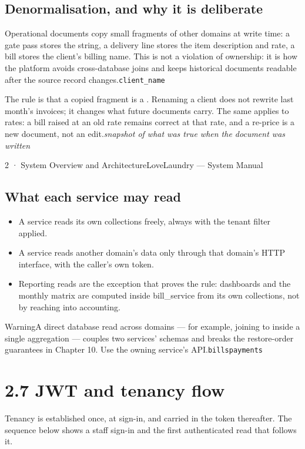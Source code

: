 \documentclass[11pt,a4paper,oneside]{book}
\begin{document}
\subsection*{Denormalisation, and why it is deliberate}
Operational documents copy small fragments of other domains at write time: a gate pass stores the  string, a delivery line stores the item description and rate, a bill stores the client's billing name. This is not a violation of ownership: it is how the platform avoids cross-database joins and keeps historical documents readable after the source record changes.\texttt{client\_name}

The rule is that a copied fragment is a . Renaming a client does not rewrite last month's invoices; it changes what future documents carry. The same applies to rates: a bill raised at an old rate remains correct at that rate, and a re-price is a new document, not an edit.\emph{snapshot of what was true when the document was written}

2 · System Overview and ArchitectureLoveLaundry — System Manual

\subsection*{What each service may read}
\begin{itemize}
\item A service reads its own collections freely, always with the tenant filter applied.
\item A service reads another domain's data only through that domain's HTTP interface, with the caller's own token.
\item Reporting reads are the exception that proves the rule: dashboards and the monthly matrix are computed inside bill\_service from its own collections, not by reaching into accounting.
\end{itemize}
\begin{notebox}WarningA direct database read across domains — for example, joining  to  inside a single aggregation — couples two services' schemas and breaks the restore-order guarantees in Chapter 10. Use the owning service's API.\texttt{bills}\texttt{payments}\end{notebox}
\section{2.7 JWT and tenancy flow}
Tenancy is established once, at sign-in, and carried in the token thereafter. The sequence below shows a staff sign-in and the first authenticated read that follows it.
\end{document}
